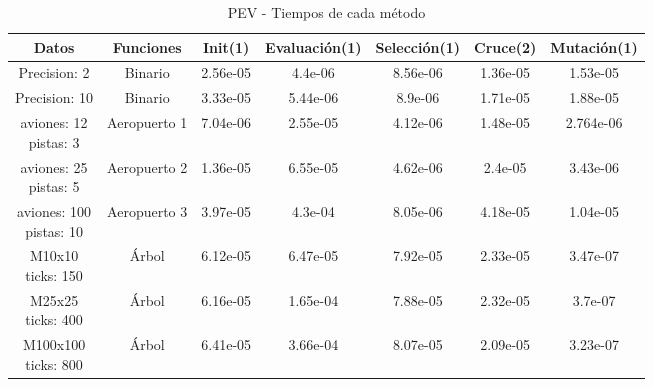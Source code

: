\begin{table}[!h]
\centering
\begin{tabular}{|c|c|c|c|c|c|c|}
	\hline
	\rowcolor{lightgray}
	\textbf{Datos} & \textbf{Funciones} & \textbf{Init(1)} & \textbf{Evaluación(1)} & \textbf{Selección(1)} & \textbf{Cruce(2)} & \textbf{Mutación(1)} \\
	\hline
	Precision: 2 & Binario & 2.56e-05 & 4.4e-06 & 8.56e-06 & \cellcolor{redcell} 1.36e-05 & \cellcolor{redcell} 1.53e-05 \\
	\hline
	Precision: 10 & Binario & 3.33e-05 & 5.44e-06 & 8.9e-06 & \cellcolor{redcell} 1.71e-05 & \cellcolor{redcell} 1.88e-05 \\
	\hline
	\makecell{aviones: 12 \\ pistas: 3} & Aeropuerto 1 & 7.04e-06 & \cellcolor{redcell} 2.55e-05 & 4.12e-06 & 1.48e-05 & 2.764e-06 \\
	\hline
	\makecell{aviones: 25 \\ pistas: 5} & Aeropuerto 2 & 1.36e-05 & \cellcolor{redcell} 6.55e-05 & 4.62e-06 & 2.4e-05 & 3.43e-06 \\
	\hline
	\makecell{aviones: 100 \\ pistas: 10} & Aeropuerto 3 & 3.97e-05 & \cellcolor{redcell} 4.3e-04 & 8.05e-06 & 4.18e-05 & 1.04e-05 \\
	\hline
	\makecell{M10x10 \\ ticks: 150} & Árbol & 6.12e-05 & \cellcolor{redcell} 6.47e-05 & 7.92e-05 & 2.33e-05 & 3.47e-07 \\
	\hline
	\makecell{M25x25 \\ ticks: 400} & Árbol & 6.16e-05 & \cellcolor{redcell} 1.65e-04 & 7.88e-05 & 2.32e-05 & 3.7e-07 \\
	\hline
	\makecell{M100x100 \\ ticks: 800} & Árbol & 6.41e-05 & \cellcolor{redcell} 3.66e-04 & 8.07e-05 & 2.09e-05 & 3.23e-07 \\
	\hline
\end{tabular}
\caption{PEV - Tiempos de cada método}
\label{tab:sample}
\end{table}

\newpage



